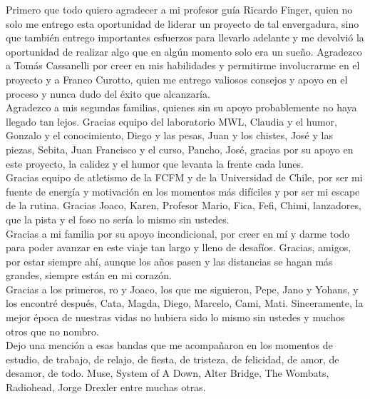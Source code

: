 \documentclass[
	spanish, %
	letterpaper, oneside
]{book}
\begin{document}
\begin{acknowledgments}
	Primero que todo quiero agradecer a mi profesor guía Ricardo Finger, quien no solo me entrego esta oportunidad de liderar un proyecto de tal envergadura, sino que también entrego importantes esfuerzos para llevarlo adelante y me devolvió la oportunidad de realizar algo que en algún momento solo era un sueño. Agradezco a Tomás Cassanelli por creer en mis habilidades y permitirme involucrarme en el proyecto y a Franco Curotto, quien me entrego valiosos consejos y apoyo en el proceso y nunca dudo del éxito que alcanzaría.\\

	Agradezco a mis segundas familias, quienes sin su apoyo probablemente no haya llegado tan lejos. Gracias equipo del laboratorio MWL, Claudia y el humor, Gonzalo y el conocimiento, Diego y las pesas, Juan y los chistes, José y las piezas, Sebita, Juan Francisco y el curso, Pancho, José, gracias por su apoyo en este proyecto, la calidez y el humor que levanta la frente cada lunes.\\

	Gracias equipo de atletismo de la FCFM y de la Universidad de Chile, por ser mi fuente de energía y motivación en los momentos más difíciles y por ser mi escape de la rutina. Gracias Joaco, Karen, Profesor Mario, Fica, Fefi, Chimi, lanzadores, que la pista y el foso no sería lo mismo sin ustedes.\\

	Gracias a mi familia por su apoyo incondicional, por creer en mí y darme todo para poder avanzar en este viaje tan largo y lleno de desafíos. Gracias, amigos, por estar siempre ahí, aunque los años pasen y las distancias se hagan más grandes, siempre están en mi corazón.\\

	Gracias a los primeros, ro y Joaco, los que me siguieron, Pepe, Jano y Yohans, y los encontré después, Cata, Magda, Diego, Marcelo, Cami, Mati. Sinceramente, la mejor época de nuestras vidas no hubiera sido lo mismo sin ustedes y muchos otros que no nombro.\\

	Dejo una mención a esas bandas que me acompañaron en los momentos de estudio, de trabajo, de relajo, de fiesta, de tristeza, de felicidad, de amor, de desamor, de todo. Muse, System of A Down, Alter Bridge, The Wombats, Radiohead, Jorge Drexler entre muchas otras.\\
\end{acknowledgments}

\templateIndex

\templateFinalcfg












\end{document}
